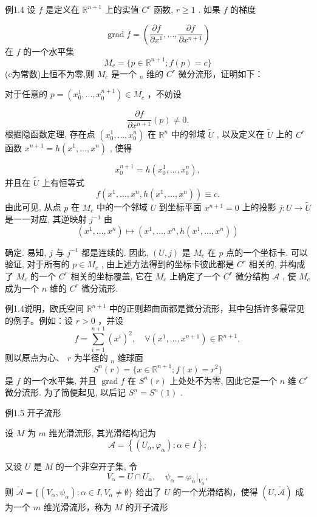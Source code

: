 例1.4 设  $f$  是定义在  $\mathbb{R}^{n+1}$  上的实值  $C^r$  函数,  $r \geqslant 1$ . 如果  $f$  的梯度

$$
\operatorname {g r a d} f = \left(\frac {\partial f}{\partial x ^ {1}}, \dots , \frac {\partial f}{\partial x ^ {n + 1}}\right)
$$
在  $f$  的一个水平集
$$
M _ {c} = \{p \in \mathbb {R} ^ {n + 1}; f (p) = c \}
$$
(c为常数)上恒不为零,则  $M_{c}$  是一个  $_{n}$  维的  $C^r$  微分流形，证明如下：

对于任意的  $p = (x_0^1,\dots ,x_0^{n + 1})\in M_c$  ，不妨设

$$
\frac {\partial f}{\partial x ^ {n + 1}} (p) \neq 0.
$$
根据隐函数定理, 存在点  $(x_0^1,\dots ,x_0^n)$  在  $\mathbb{R}^n$  中的邻域  $\tilde{U}$ , 以及定义在  $\tilde{U}$  上的  $C^r$  函数  $x^{n + 1} = h(x^{1},\dots ,x^{n})$ , 使得

$$
x _ {0} ^ {n + 1} = h \left(x _ {0} ^ {1}, \dots , x _ {0} ^ {n}\right),
$$
并且在  $\tilde{U}$  上有恒等式
$$
f (x ^ {1}, \dots , x ^ {n}, h (x ^ {1}, \dots , x ^ {n})) \equiv c.
$$
由此可见, 从点  $p$  在  $M_{c}$  中的一个邻域  $U$  到坐标平面  $x^{n + 1} = 0$  上的投影  $j: U \to \tilde{U}$  是一一对应, 其逆映射  $j^{-1}$  由
$$
(x ^ {1}, \dots , x ^ {n}) \longmapsto (x ^ {1}, \dots , x ^ {n}, h (x ^ {1}, \dots , x ^ {n}))
$$

确定. 易知,  $j$  与  $j^{-1}$  都是连续的. 因此,  $(U,j)$  是  $M_{c}$  在  $p$  点的一个坐标卡. 可以验证, 对于所有的  $p \in M_{c}$ , 由上述方法得到的坐标卡彼此都是  $C^{r}$  相关的, 并构成了  $M_{c}$  的一个  $C^{r}$  相关的坐标覆盖, 它在  $M_{c}$  上确定了一个  $C^{r}$  微分结构  $\mathcal{A}$ , 使  $M_{c}$  成为一个  $n$  维的  $C^{r}$  微分流形.

例1.4说明，欧氏空间  $\mathbb{R}^{n + 1}$  中的正则超曲面都是微分流形，其中包括许多最常见的例子。例如：设  $r > 0$  ，并设
$$
f = \sum_ {i = 1} ^ {n + 1} (x ^ {i}) ^ {2}, \quad \forall (x ^ {1}, \dots , x ^ {n + 1}) \in \mathbb {R} ^ {n + 1},
$$
则以原点为心、  $r$  为半径的  $_n$  维球面
$$
S ^ {n} (r) = \{x \in \mathbb {R} ^ {n + 1}; f (x) = r ^ {2} \}
$$
是  $f$  的一个水平集, 并且  $\operatorname{grad} f$  在  $S^n(r)$  上处处不为零, 因此它是一个  $n$  维  $C^r$  微分流形. 为了简便起见, 以后记  $S^n = S^n(1)$ .

例1.5 开子流形

设  $M$  为  $m$  维光滑流形, 其光滑结构记为
$$
\mathcal {A} = \left\{\left(U _ {\alpha}, \varphi_ {\alpha}\right); \alpha \in I \right\};
$$

又设  $U$  是  $M$  的一个非空开子集, 令
$$
V _ {\alpha} = U \cap U _ {\alpha}, \quad \psi_ {\alpha} = \varphi_ {\alpha} | _ {V _ {\alpha}},
$$
则  $\tilde{\mathcal{A}} = \{(V_{\alpha},\psi_{\alpha});\alpha \in I,V_{\alpha}\neq \emptyset \}$  给出了  $U$  的一个光滑结构，使得 $(U,\tilde{\mathcal{A}})$  成为一个  $m$  维光滑流形，称为  $M$  的开子流形

